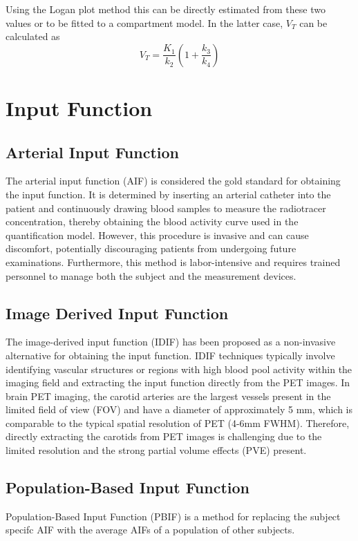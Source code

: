 Using the Logan plot method this can be directly estimated from these two values or to be fitted to a compartment model. In the latter case, $V_T$ can be calculated as
\[
	V_T = \frac{K_1}{k_2} (1+\frac{k_3}{k_4})
\]


\section{Input Function}
\subsection{Arterial Input Function}
The arterial input function (AIF) is considered the gold standard for obtaining the input function.
It is determined by inserting an arterial catheter into the patient and continuously drawing blood samples to measure the radiotracer concentration, thereby obtaining the blood activity curve used in the quantification model.
However, this procedure is invasive and can cause discomfort, potentially discouraging patients from undergoing future examinations.
Furthermore, this method is labor-intensive and requires trained personnel to manage both the subject and the measurement devices.

\subsection{Image Derived Input Function}
The image-derived input function (IDIF) has been proposed as a non-invasive alternative for obtaining the input function.
IDIF techniques typically involve identifying vascular structures or regions with high blood pool activity within the imaging field and extracting the input function directly from the PET images.
In brain PET imaging, the carotid arteries are the largest vessels present in the limited field of view (FOV) and have a diameter of approximately 5 mm, which is comparable to the typical spatial resolution of PET (4-6mm FWHM).
Therefore, directly extracting the carotids from PET images is challenging due to the limited resolution and the strong partial volume effects (PVE) present.

\subsection{Population-Based Input Function}
Population-Based Input Function (PBIF) is a method for replacing the subject specifc AIF with the average AIFs of a population of other subjects.


